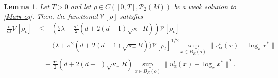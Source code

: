 \documentclass[11pt]{amsart}
\newtheorem{lemma}{Lemma}[section]
\def\d{\mathrm{d}}
\newcommand{\dm}{d} %
\begin{document}
 

 

\begin{lemma} \label{lem:dissipative}
Let $T>0$ and let $\rho\in C\left([0,T], \mathcal P_2(M)\right)$ be a weak solution to \eqref{Main-eq}. Then, the functional $\mathcal V[\rho]$ satisfies
\begin{align*}
\frac{\d}{\d t}\mathcal{V}[\rho_t] & \leq  -\left(2\lambda -   \frac{\sigma^2}{2} (\dm+2(d-1)\sqrt{\kappa_-}R) \right)\mathcal{V}[\rho_t]  \\
&\quad +\Big(  \lambda + \sigma^2 (\dm+2(d-1)\sqrt{\kappa_-}R)\Big)  \mathcal{V}[\rho_t]^{1/2}\sup_{x\in B_R(o)}\|u_\alpha^t(x)-\log_xx^*\| \\
&\quad +  \frac{\sigma^2}{2} (\dm+2(d-1)\sqrt{
\kappa_-}R) \sup_{x\in B_R(o)}\|u_\alpha^t(x)-\log_xx^*\|^2.
\end{align*}
\end{lemma}
\end{document}
